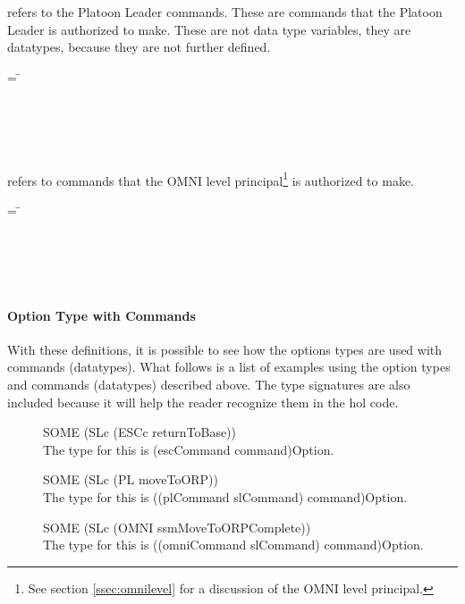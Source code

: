 \documentclass[../../main/main.tex]{subfiles}
\begin{document}
 refers to the Platoon Leader commands.  These are commands that the Platoon Leader is authorized to make.  These are not data type variables, they are datatypes, because they are not further defined.

\begin{tabbing}
 = \=  \\
					     \>\HOLTokenBar{}  \\
					     \>\HOLTokenBar{}  \\
					     \>\HOLTokenBar{} \\
         				     \> \HOLTokenBar{}  \\
				             \> \HOLTokenBar{} 
\end{tabbing}


 refers to commands that the OMNI level principal\footnote{See section \ref{ssec:omnilevel} for a discussion of the OMNI level principal.} is authorized to make. 

\begin{tabbing}
 = \=  \\
						 \> \HOLTokenBar{} \\
 				       	 	 \> \HOLTokenBar{}  \\
						 \> \HOLTokenBar{} \\
            					 \> \HOLTokenBar{} \\
					 	 \> \HOLTokenBar{} 
\end{tabbing}          
          
          
\paragraph*{Option Type with Commands}
With these definitions, it is possible to see how the options types are used with commands (datatypes).  What follows is a list of examples using the option types and commands (datatypes) described above.  The type signatures are also included because it will help the reader recognize them in the \gls{hol} code.
\begin{description}
\item[ ] SOME (SLc (ESCc returnToBase)) \\
The type for this is (escCommand command)Option.
\item[ ] SOME (SLc (PL moveToORP))  \\
The type for this is ((plCommand slCommand) command)Option.  
\item[ ] SOME (SLc (OMNI ssmMoveToORPComplete))\\
The type for this is ((omniCommand slCommand) command)Option.  
\end{description}
\end{document}
